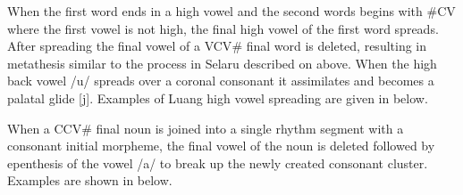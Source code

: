 When the first word ends in a high vowel
and the second words begins with {\#}CV where the first vowel is not high,
the final high vowel of the first word spreads.
After spreading the final vowel of a VCV{\#} final word is deleted,
resulting in metathesis similar to the process in Selaru
described on  above.
When the high back vowel /u/ spreads over a coronal consonant it
assimilates and becomes a palatal glide [j].
Examples of Luang high vowel spreading are given in  below.

\begin{exe}	%
	\label{ex:LuaHigVowSpr}
\end{exe}

When a CCV{\#} final noun is joined into a single rhythm segment
with a consonant initial morpheme,
the final vowel of the noun is deleted followed by epenthesis
of the vowel /a/ to break up the newly created consonant cluster.
Examples are shown in  below.

